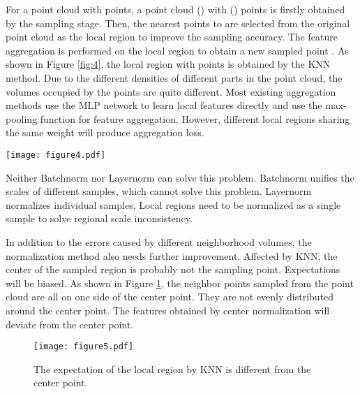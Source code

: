 \documentclass[10pt,twocolumn,letterpaper]{article}
\begin{document}
        For a point cloud  with  points, a point cloud  () with  () points is firstly obtained by the sampling stage. Then, the  nearest points to  are selected from the original point cloud  as the local region to improve the sampling accuracy. The feature aggregation is performed on the local region to obtain a new sampled point . As shown in Figure \ref{fig:4}, the local region with  points is obtained by the KNN method. Due to the different densities of different parts in the point cloud, the volumes occupied by the  points are quite different. Most existing aggregation methods use the MLP network to learn local features directly and use the max-pooling function for feature aggregation. However, different local regions sharing the same weight will produce aggregation loss.
        \begin{figure*}[!htb]
        \centering
        \texttt{[image: figure4.pdf]}
        \caption{Apply KNN on point clouds with different point densities. Neighbors obtained in low-density regions have a larger volume but the volume is smaller in high-density regions. (a) Low-density region. (b) High-density region.}
        \label{fig:4}
        \end{figure*}

        Neither Batchnorm nor Layernorm can solve this problem. Batchnorm unifies the scales of different samples, which cannot solve this problem. Layernorm normalizes individual samples. Local regions need to be normalized as a single sample to solve regional scale inconsistency.

        In addition to the errors caused by different neighborhood volumes, the normalization method also needs further improvement. Affected by KNN, the center of the sampled region is probably not the sampling point. Expectations will be biased. As shown in Figure \ref{fig:5}, the  neighbor points sampled from the point cloud are all on one side of the center point. They are not evenly distributed around the center point. The features obtained by center normalization will deviate from the center point.
        \begin{figure}[!htb]
        \centering
        \texttt{[image: figure5.pdf]}
        \caption{The expectation of the local region by KNN is different from the center point.}
        \label{fig:5}
        \end{figure}
\end{document}
